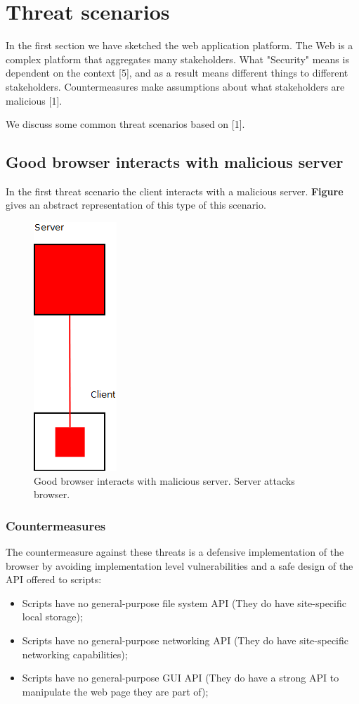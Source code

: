 \section{Threat scenarios}

In the first section we have sketched the web application platform. The Web is a complex platform that aggregates many stakeholders. What "Security" means is dependent on the context [5], and as a result means different things to different stakeholders. Countermeasures make assumptions about what stakeholders are malicious [1].

We discuss some common threat scenarios based on [1].


\subsection{Good browser interacts with malicious server}

In the first threat scenario the client interacts with a malicious server. \textbf{Figure} gives an abstract representation of this type of this scenario.

\begin{figure}
	\begin{center}		
		\includegraphics[width=0.1\columnwidth]{img/security/threat-scenario-good-browser-bad-server}
		\caption{Good browser interacts with malicious server. Server attacks browser.}
		\label{fig:threat-scenario:good-browser-bad-server}
	\end{center}
\end{figure}


\subsubsection{Countermeasures}

The countermeasure against these threats is a defensive implementation of the browser by avoiding implementation level vulnerabilities and a safe design of the API offered to scripts:
\begin{itemize}
	\item Scripts have no general-purpose file system API (They do have site-specific local storage);
	\item Scripts have no general-purpose networking API (They do have site-specific networking capabilities);
	\item Scripts have no general-purpose GUI API (They do have a strong API to manipulate the web page they are part of);
\end{itemize}

